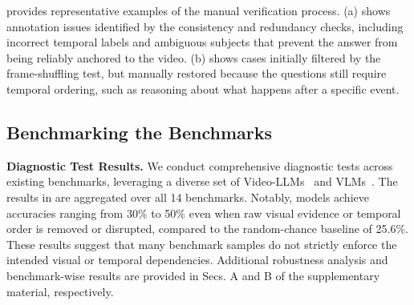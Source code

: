 \documentclass[runningheads]{llncs}
\begin{document}
{         provides representative examples of the manual verification process.
        (a) shows annotation issues identified by the consistency and redundancy checks, including incorrect temporal labels and ambiguous subjects that prevent the answer from being reliably anchored to the video.
        (b) shows cases initially filtered by the frame-shuffling test, but manually restored because the questions still require temporal ordering, such as reasoning about what happens after a specific event.

    \subsection{Benchmarking the Benchmarks}
    \label{sec:3.2}
        \noindent\textbf{Diagnostic Test Results.} 
        We conduct comprehensive diagnostic tests across existing benchmarks, leveraging a diverse set of Video-LLMs~\cite{eagle25,qwem3_vl,qwen25vl,videoautor1} and VLMs~\cite{clip,longclip,evaclip}.
        The results in  are aggregated over all 14 benchmarks.
        Notably, models achieve accuracies ranging from 30\% to 50\% even when raw visual evidence or temporal order is removed or disrupted, compared to the random-chance baseline of 25.6\%.
        These results suggest that many benchmark samples do not strictly enforce the intended visual or temporal dependencies.
        Additional robustness analysis and benchmark-wise results are provided in Secs. A and B of the supplementary material, respectively.
                                    
}
\end{document}
